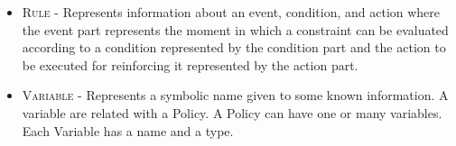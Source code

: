 \begin{itemize}
\begin{itemize}
		  \item \textsc{Rule -} Represents information about an event, condition, and
		  action where the event part represents the moment in which a constraint can be
		  evaluated according to a condition represented by the condition part and the
		  action to be executed for reinforcing it represented by the action part.
		  \item \textsc{Variable -} Represents a symbolic name given to some known
		  information. A variable are related with a Policy. A Policy can have one or
		  many variables. Each Variable has a name and a type.
	\end{itemize}
\end{itemize}





% 
% 
% 
